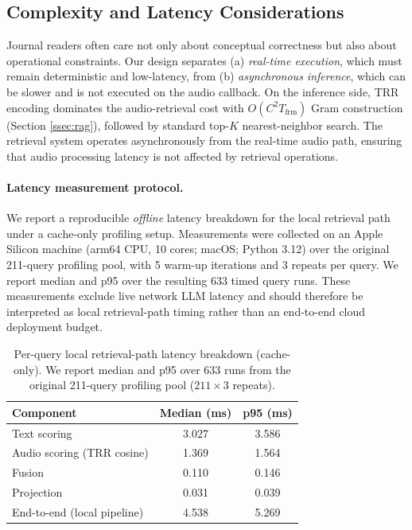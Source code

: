 \subsection{Complexity and Latency Considerations}
\label{ssec:complexity_latency}
Journal readers often care not only about conceptual correctness but also about operational constraints. Our design separates (a) \textit{real-time execution}, which must remain deterministic and low-latency, from (b) \textit{asynchronous inference}, which can be slower and is not executed on the audio callback.
On the inference side, TRR encoding dominates the audio-retrieval cost with $O(C^2 T_{\text{frm}})$ Gram construction (Section \ref{ssec:rag}), followed by standard top-$K$ nearest-neighbor search. The retrieval system operates asynchronously from the real-time audio path, ensuring that audio processing latency is not affected by retrieval operations.

\paragraph{Latency measurement protocol.}
We report a reproducible \emph{offline} latency breakdown for the local retrieval path under a cache-only profiling setup. Measurements were collected on an Apple Silicon machine (arm64 CPU, 10 cores; macOS; Python 3.12) over the original 211-query profiling pool, with 5 warm-up iterations and 3 repeats per query. We report median and p95 over the resulting 633 timed query runs. These measurements exclude live network LLM latency and should therefore be interpreted as local retrieval-path timing rather than an end-to-end cloud deployment budget.

\begin{table}[t]
	\centering
\caption{Per-query local retrieval-path latency breakdown (cache-only). We report median and p95 over 633 runs from the original 211-query profiling pool ($211\times 3$ repeats).}
	\label{tab:latency_breakdown}
	\begin{tabular}{lcc}
		\toprule
		\textbf{Component} & \textbf{Median (ms)} & \textbf{p95 (ms)} \\
		\midrule
		Text scoring & 3.027 & 3.586 \\
		Audio scoring (TRR cosine) & 1.369 & 1.564 \\
		Fusion & 0.110 & 0.146 \\
		Projection & 0.031 & 0.039 \\
		End-to-end (local pipeline) & 4.538 & 5.269 \\
		\bottomrule
	\end{tabular}
\end{table}

